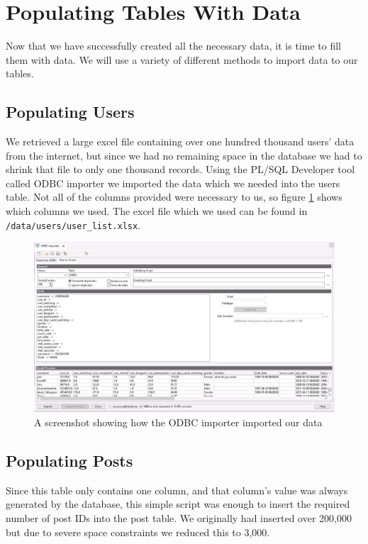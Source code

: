 \section{Populating Tables With Data}

Now that we have successfully created all the necessary data, it is time to fill them with data. We will use a variety of different methods to import data to our tables.

\subsection{Populating Users}

We retrieved a large excel file containing over one hundred thousand users' data from the internet, but since we had no remaining space in the database we had to shrink that file to only one thousand records. Using the PL/SQL Developer tool called ODBC importer we imported the data which we needed into the users table. Not all of the columns provided were necessary to us, so figure \ref{users-odbc} shows which columns we used. The excel file which we used can be found in \verb`/data/users/user_list.xlsx`.

\begin{figure}[hbtp]
	\centering
	\includegraphics[width=\linewidth]{images/users_odbc.jpeg}
	\caption{A screenshot showing how the ODBC importer imported our data}
	\label{users-odbc}
\end{figure}

\subsection{Populating Posts}

Since this table only contains one column, and that column's value was always generated by the database, this simple script was enough to insert the required number of post IDs into the post table. We originally had inserted over 200,000 but due to severe space constraints we reduced this to 3,000.

